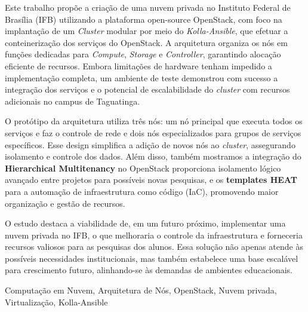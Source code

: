 
Este trabalho propõe a criação de uma nuvem privada no Instituto Federal de Brasília (IFB) utilizando a plataforma open-source OpenStack, com foco na implantação de um \textit{Cluster} modular por meio do \textit{Kolla-Ansible}, que efetuar a conteinerização dos serviços do OpenStack. A arquitetura organiza os nós em funções dedicadas para \textit{Compute}, \textit{Storage} e \textit{Controller}, garantindo alocação eficiente de recursos. Embora limitações de hardware tenham impedido a implementação completa, um ambiente de teste demonstrou com sucesso a integração dos serviços e o potencial de escalabilidade do \textit{cluster} com recursos adicionais no campus de Taguatinga.
    
O protótipo da arquitetura utiliza três nós: um nó principal que executa todos os serviços e faz o controle de rede e dois nós especializados para grupos de serviços específicos. Esse design simplifica a adição de novos nós ao \textit{cluster}, assegurando isolamento e controle dos dados. Além disso, também mostramos a integração do \textbf{Hierarchical Multitenancy} no OpenStack proporciona isolamento lógico avançado entre projetos para possíveis novas pesquisas, e os \textbf{templates HEAT} para a automação de infraestrutura como código (IaC), promovendo maior organização e gestão de recursos.
    
O estudo destaca a viabilidade de, em um futuro próximo, implementar uma nuvem privada no IFB, o que melhoraria o controle da infraestrutura e forneceria recursos valiosos para as pesquisas dos alunos. Essa solução não apenas atende às possíveis necessidades institucionais, mas também estabelece uma base escalável para crescimento futuro, alinhando-se às demandas de ambientes educacionais.
 

\begin{keywords}
Computação em Nuvem, Arquitetura de Nós, OpenStack, Nuvem privada, Virtualização, Kolla-Ansible
\end{keywords}
